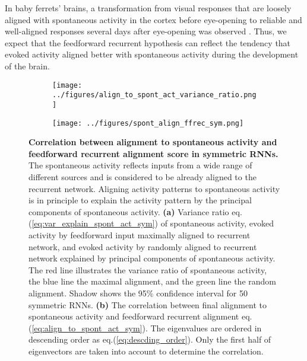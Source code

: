 \documentclass[11pt]{article}
\begin{document}
	In baby ferrets' brains, a transformation from visual responses that are loosely aligned with spontaneous activity in the cortex before eye-opening to reliable and well-aligned responses several days after eye-opening was observed \cite{tragenap2023nature}. Thus, we expect that the feedforward recurrent hypothesis can reflect the tendency that evoked activity aligned better with spontaneous activity during the development of the brain. 
	\vspace{-0.4cm}
		\begin{figure}[H] 
			\centering
			\begin{subfigure}[b]{0.45\textwidth} 
				\texttt{[image: ../figures/align\_to\_spont\_act\_variance\_ratio.png]}
				\caption{}
				\label{fig:variance_ratio_sym}
			\end{subfigure}
			\begin{subfigure}[b]{0.45\textwidth}
				\texttt{[image: ../figures/spont\_align\_ffrec\_sym.png]}
				\caption{}
				\label{fig:align_spont_sym}
			\end{subfigure}
			\caption[Correlation between alignment to spontaneous activity and feedforward recurrent alignment score in symmetric RNNs]{\textbf{Correlation between alignment to spontaneous activity and feedforward recurrent alignment score in symmetric RNNs.} The spontaneous activity reflects inputs from a wide range of different sources and is considered to be already aligned to the recurrent network\cite{tragenap2023nature}. Aligning activity patterns to spontaneous activity is in principle to explain the activity pattern by the principal components of spontaneous activity. \textbf{(a)} Variance ratio eq.(\ref{eq:var_explain_spont_act_sym}) of spontaneous activity, evoked activity by feedforward input maximally aligned to recurrent network, and evoked activity by randomly aligned to recurrent network explained by principal components of spontaneous activity. The red line illustrates the variance ratio of spontaneous activity, the blue line the maximal alignment, and the green line the random alignment. Shadow shows the 95\% confidence interval for 50 symmetric RNNs. \textbf{(b)} The correlation between final alignment to spontaneous activity and feedforward recurrent alignment eq.(\ref{eq:align_to_spont_act_sym}). The eigenvalues are ordered in descending order as eq.(\ref{eq:descding_order}). Only the first half of eigenvectors are taken into account to determine the correlation.}
			\label{fig:align_spont_act_sym}
		\end{figure}
	
\end{document}

